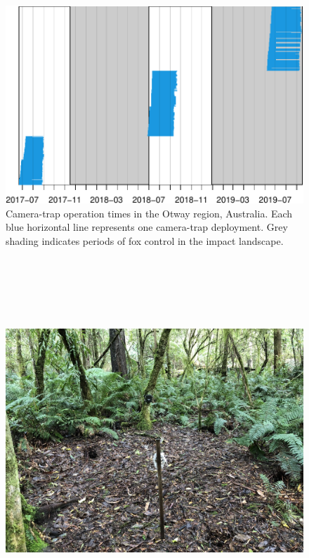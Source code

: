 \documentclass[11pt,a4paper,titlepage,twoside,openright]{style/unimelbthesis}
\begin{document}
\begin{mainmatter}
\newpage

\(~\)

\(~\)

\(~\)
\begin{figure}

{\centering \includegraphics[width=1\linewidth]{figure/density-camop-1} 

}

\caption{Camera-trap operation times in the Otway region, Australia. Each blue horizontal line represents one camera-trap deployment. Grey shading indicates periods of fox control in the impact landscape.}\label{fig:density-camop}
\end{figure}
\newpage

\(~\)

\(~\)

\(~\)
\begin{figure}

{\centering \includegraphics[width=1\linewidth]{figure/c3/camtrap1} 

}
\end{figure}
\end{mainmatter}
\end{document}
